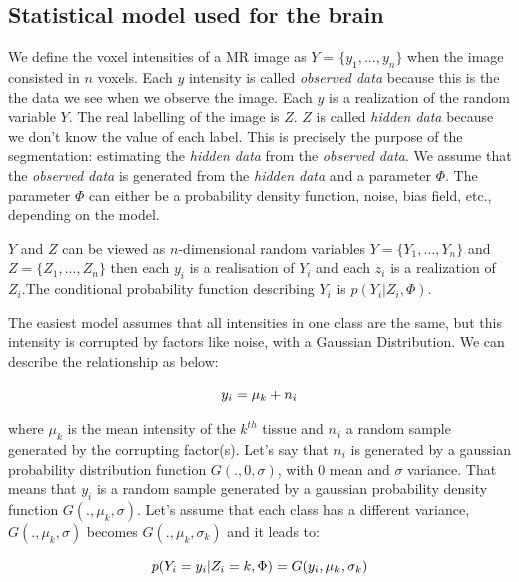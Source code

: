 \subsection{Statistical model used for the brain}
%
We define the voxel intensities of a MR image as $Y=\lbrace y_1, ..., y_n\rbrace$ when the image consisted in $n$ voxels. Each $y$ intensity is called \textit{observed data} because this is the the data we see when we observe the image. Each $y$ is a realization of the random variable $Y$. The real labelling of the image is $Z$. $Z$ is called \textit{hidden data} because we don't know the value of each label. This is precisely the purpose of the segmentation: estimating the \textit{hidden data} from the \textit{observed data}. We assume that the \textit{observed data} is generated from the \textit{hidden data} and a parameter $\Phi$. The parameter $\Phi$ can either be a probability density function, noise, bias field, etc., depending on the model.
\par
$Y$ and $Z$ can be viewed as $n$-dimensional random variables $Y=\lbrace Y_1, ..., Y_n\rbrace$ and $Z=\lbrace Z_1, ..., Z_n\rbrace$ then each $y_i$ is a realisation of $Y_i$ and each $z_i$ is a realization of $Z_i$.The conditional probability function describing $Y_i$ is $p(Y_i|Z_i,\Phi)$.
\par
The easiest model assumes that all intensities in one class are the same, but this intensity is corrupted by factors like noise,  with a Gaussian Distribution. We can describe the relationship as below:
  
  \begin{equation*}
  y_i=\mu_k+n_i\\
  \end{equation*}

\par
where $\mu_k$ is the mean intensity of the $k^{th}$ tissue and $n_i$ a random sample generated by the corrupting factor(s). Let's say that $n_i$ is generated by a gaussian probability distribution function $G(.,0,\sigma)$, with $0$ mean and $\sigma$ variance. That means that $y_i$ is a random sample generated by a gaussian probability density function $G(.,\mu_k,\sigma)$. Let's assume that each class has a different variance, $G(.,\mu_k,\sigma)$ becomes $G(.,\mu_k,\sigma_k)$ and it leads to:
  
  \begin{equation}\label{CDP}
  p(Y_i=y_i|Z_i=k,\Phi)=G(y_i,\mu_k,\sigma_k)\\
  \end{equation}

